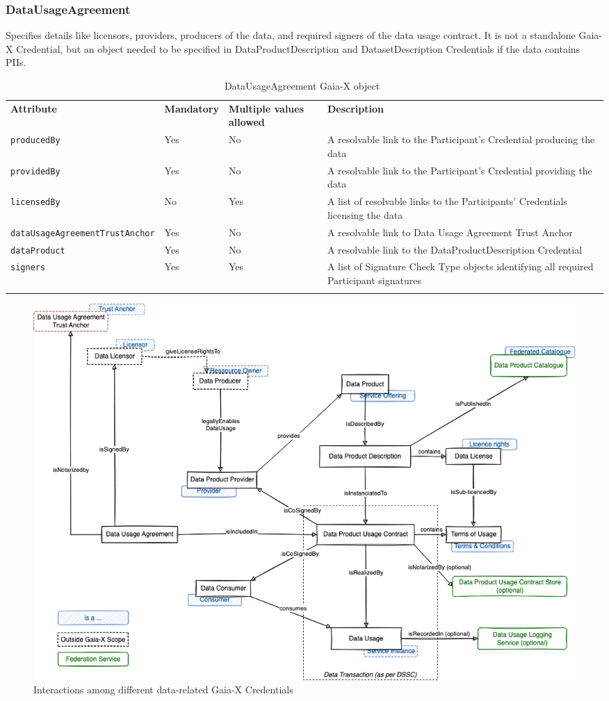 \subsubsection{DataUsageAgreement}
Specifies details like licensors, providers, producers of the data, and required signers of the data usage contract.
It is not a standalone Gaia-X Credential, but an object needed to be specified in DataProductDescription and DatasetDescription Credentials if the data contains PIIs.

\begin{longtable}{ |p{4cm}|p{2cm}|p{2cm}|p{7cm}| }
    \hhline{----}
    \textbf{Attribute} & \textbf{Mandatory} & \textbf{Multiple values allowed} & \textbf{Description}\\
    \hhline{----}
    \texttt{producedBy} & Yes & No & A resolvable link to the Participant's Credential producing the data\\
    \hhline{----}
    \texttt{providedBy} & Yes & No & A resolvable link to the Participant's Credential providing the data\\
    \hhline{----}
    \texttt{licensedBy} & No & Yes & A list of resolvable links to the Participants' Credentials licensing the data\\
    \hhline{----}
    \texttt{dataUsageAgreementTrustAnchor} & Yes & No & A resolvable link to Data Usage Agreement Trust Anchor\\
    \hhline{----}
    \texttt{dataProduct} & Yes & No & A resolvable link to the DataProductDescription Credential\\
    \hhline{----}
    \texttt{signers} & Yes & Yes & A list of Signature Check Type objects identifying all required Participant signatures\\
    \hhline{----}
    \caption{DataUsageAgreement Gaia-X object~\cite{gaiax_data_exchange_document}}
    \label{tab:data_usage_agreement}
\end{longtable}

\begin{figure}
    \centering
    \includegraphics[width=\textwidth]{figures/data-product-conceptual-model.png}
    \caption{Interactions among different data-related Gaia-X Credentials~\cite{gaiax_architecture_document}}\label{fig:data_product_conteptual_model}
\end{figure}

